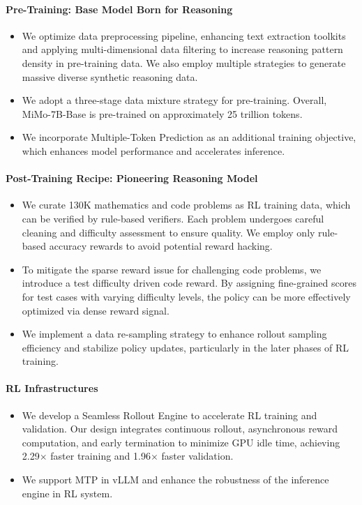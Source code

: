 \documentclass[11pt, a4paper, logo, copyright, nonumbering]{xiaomi}
\newcommand{\mimobase}{MiMo-7B-Base}
\newcommand{\rlsys}{Seamless Rollout Engine}
\begin{document}
\paragraph{Pre-Training: Base Model Born for Reasoning}
\begin{itemize}
    \item We optimize data preprocessing pipeline, enhancing text extraction toolkits and applying multi-dimensional data filtering to increase reasoning pattern density in pre-training data. We also employ multiple strategies to generate massive diverse synthetic reasoning data.
    \item We adopt a three-stage data mixture strategy for pre-training. Overall, \mimobase{} is pre-trained on approximately 25 trillion tokens.
    \item We incorporate Multiple-Token Prediction as an additional training objective, which enhances model performance and accelerates inference.
\end{itemize}

\paragraph{Post-Training Recipe: Pioneering Reasoning Model}
\begin{itemize}
    \item We curate 130K mathematics and code problems as RL training data, which can be verified by rule-based verifiers. Each problem undergoes careful cleaning and difficulty assessment to ensure quality. We employ only rule-based accuracy rewards to avoid potential reward hacking.
    \item To mitigate the sparse reward issue for challenging code problems, we introduce a test difficulty driven code reward. By assigning fine-grained scores for test cases with varying difficulty levels, the policy can be more effectively optimized via dense reward signal.
    \item We implement a data re-sampling strategy to enhance rollout sampling efficiency and stabilize policy updates, particularly in the later phases of RL training.
\end{itemize}

\paragraph{RL Infrastructures}
\begin{itemize}
    \item We develop a \rlsys{} to accelerate RL training and validation. Our design integrates continuous rollout, asynchronous reward computation, and early termination to minimize GPU idle time, achieving 2.29$\times$ faster training and 1.96$\times$ faster validation.
    \item We support MTP in vLLM and enhance the robustness of the inference engine in RL system.
\end{itemize}
\end{document}
